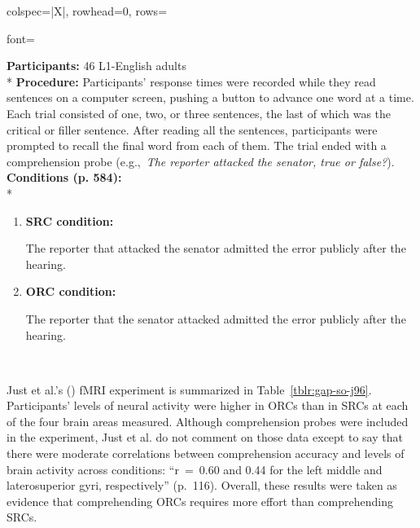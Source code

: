\begin{longtblr}[caption={\textcite{king.just1991}: Self-paced reading task (Experiment 1)}, label={tblr:gap-so-kj91}]{colspec={|X|}, rowhead=0, rows={font=\raggedright{}}}\hline
\textbf{Participants:} 46 L1-English adults \vspace{5pt}\\*
\textbf{Procedure:} Participants' response times were recorded while they read sentences on a computer screen, pushing a button to advance one word at a time. Each trial consisted of one, two, or three sentences, the last of which was the critical or filler sentence. After reading all the sentences, participants were prompted to recall the final word from each of them. The trial ended with a comprehension probe (e.g.,~\textit{The reporter attacked the senator, true or false?}). \vspace{5pt}\\
\textbf{Conditions (p. 584):} \vspace{5pt}\\*
\begin{varwidth}{\linewidth}\begin{enumerate}[\bfseries (a),itemsep=5pt] 
\item \textbf{SRC condition:}\par\nobreak
The reporter that attacked the senator admitted the error publicly after the hearing.
\item \textbf{ORC condition:}\par\nobreak
The reporter that the senator attacked admitted the error publicly after the hearing.
\end{enumerate}\end{varwidth}\\\hline
\end{longtblr}

Just et al.'s (\citeyear{just.etal1996}) fMRI experiment is summarized in Table~\ref{tblr:gap-so-j96}. Participants' levels of neural activity were higher in ORCs than in SRCs at each of the four brain areas measured. Although comprehension probes were included in the experiment, Just et al. do not comment on those data except to say that there were moderate correlations between comprehension accuracy and levels of brain activity across conditions: ``r~=~0.60 and 0.44 for the left middle and laterosuperior gyri, respectively'' (p.~116). Overall, these results were taken as evidence that comprehending ORCs requires more effort than comprehending SRCs.

